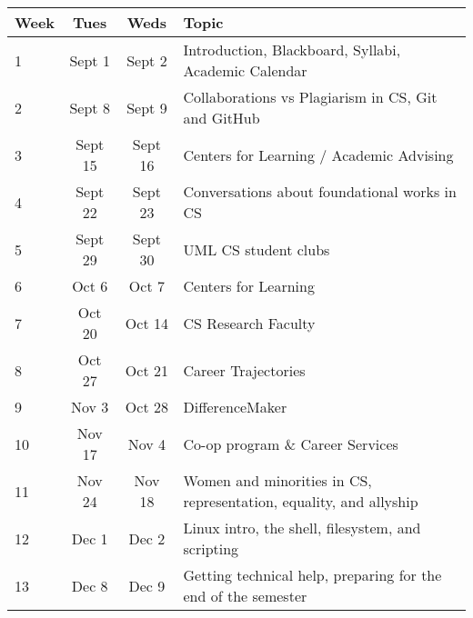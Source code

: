 \begin{center}
\begin{tabular}{|l|c|c|l|}\hline
Week & Tues & Weds & Topic \\ \hline
1 & Sept 1 & Sept 2 & Introduction, Blackboard, Syllabi, Academic Calendar\\ \hline
2 & Sept 8 & Sept 9 & Collaborations vs Plagiarism in CS, Git and GitHub\\ \hline
3 & Sept 15 & Sept 16 & Centers for Learning / Academic Advising\\ \hline
4 & Sept 22 & Sept 23 & Conversations about foundational works in CS\\ \hline
5 & Sept 29 & Sept 30 & UML CS student clubs\\ \hline
6 & Oct 6 & Oct 7 & Centers for Learning\\ \hline
7 & Oct 20 & Oct 14 & CS Research Faculty\\ \hline
8 & Oct 27 & Oct 21 & Career Trajectories\\ \hline
9 & Nov 3 & Oct 28 & DifferenceMaker\\ \hline
10 & Nov 17 & Nov 4 & Co-op program \& Career Services\\ \hline
11 & Nov 24 & Nov 18 & Women and minorities in CS, representation, equality, and allyship\\ \hline
12 & Dec 1 & Dec 2 & Linux intro, the shell, filesystem, and scripting\\ \hline
13 & Dec 8 & Dec 9 & Getting technical help, preparing for the end of the semester\\ \hline
\end{tabular}
\end{center}


